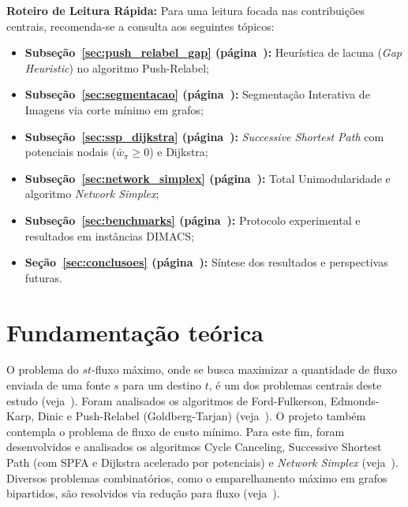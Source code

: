 \noindent \textbf{Roteiro de Leitura Rápida:}
Para uma leitura focada nas contribuições centrais, recomenda-se a consulta aos seguintes tópicos:
\begin{itemize}[leftmargin=1.5em, itemsep=0.15em, topsep=0.2em, parsep=0em]
    \item \textbf{Subseção~\ref{sec:push_relabel_gap} (página~\pageref{sec:push_relabel_gap}):} Heurística de lacuna (\textit{Gap Heuristic}) no algoritmo Push-Relabel;
    \item \textbf{Subseção~\ref{sec:segmentacao} (página~\pageref{sec:segmentacao}):} Segmentação Interativa de Imagens via corte mínimo em grafos;
    \item \textbf{Subseção~\ref{sec:ssp_dijkstra} (página~\pageref{sec:ssp_dijkstra}):} \textit{Successive Shortest Path} com potenciais nodais ($\bar{w}_\pi \ge 0$) e Dijkstra;
    \item \textbf{Subseção~\ref{sec:network_simplex} (página~\pageref{sec:network_simplex}):} Total Unimodularidade e algoritmo \textit{Network Simplex};
    \item \textbf{Subseção~\ref{sec:benchmarks} (página~\pageref{sec:benchmarks}):} Protocolo experimental e resultados em instâncias DIMACS;
    \item \textbf{Seção~\ref{sec:conclusoes} (página~\pageref{sec:conclusoes}):} Síntese dos resultados e perspectivas futuras.
\end{itemize}

\section{Fundamentação teórica}\label{sec:fundamentacao}
O problema do $st$-fluxo máximo, onde se busca maximizar a quantidade de fluxo enviada de uma fonte $s$ para um destino $t$, é um dos problemas centrais deste estudo (veja~\cite{ford1956maximal}). Foram analisados os algoritmos de Ford-Fulkerson, Edmonds-Karp, Dinic e Push-Relabel (Goldberg-Tarjan) (veja~\cite{ford1956maximal, edmonds1972theoretical, dinic1970algorithm, goldberg1988new}).
O projeto também contempla o problema de fluxo de custo mínimo. Para este fim, foram desenvolvidos e analisados os algoritmos Cycle Canceling, Successive Shortest Path (com SPFA e Dijkstra acelerado por potenciais) e \textit{Network Simplex} (veja~\cite{dantzig1951application, ahuja1993network}).
Diversos problemas combinatórios, como o emparelhamento máximo em grafos bipartidos, são resolvidos via redução para fluxo (veja~\cite{ahuja1993network}).

